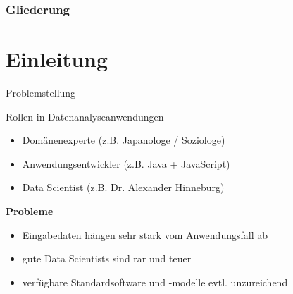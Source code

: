 \documentclass{beamer}
\begin{document}
\begin{frame}
\frametitle{Gliederung}
\tableofcontents
\end{frame}

\section{Einleitung}
\begin{frame}[t]{Problemstellung}
\vspace*{0.7em}
\begin{block}{Rollen in Datenanalyseanwendungen}
	\begin{itemize}
	\setlength{\itemsep}{.4em}
	\item Domänenexperte \hfill (z.B. Japanologe / Soziologe)
	\item Anwendungsentwickler \hfill (z.B. Java + JavaScript)
	\item Data Scientist \hfill (z.B. Dr. Alexander Hinneburg)
	\end{itemize}
\end{block}

\textbf{Probleme}
\begin{itemize}
	\item Eingabedaten hängen sehr stark vom Anwendungsfall ab
	\item gute Data Scientists sind rar und teuer
	\item verfügbare Standardsoftware und -modelle evtl. unzureichend
\end{itemize}


\end{frame}
\end{document}
